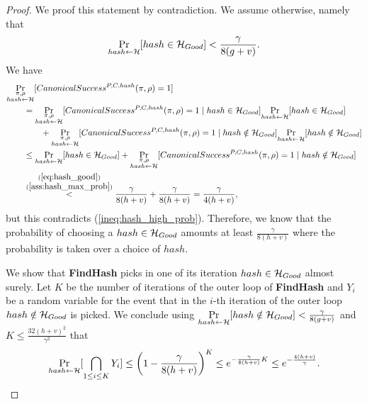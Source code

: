 \begin{proof}
We proof this statement by contradiction.
We assume otherwise, namely that
\begin{align}
  \label{ass:hash_max_prob}
\underset{hash \leftarrow \mathcal{H}}{\Pr}[hash \in \mathcal{H}_{Good}] < \frac{\gamma}{8(g+v)}.
\end{align}
We have
\begin{align*}
  &\underset{\substack{\pi, \rho \\ hash \leftarrow \mathcal{H}}}{\Pr}[CanonicalSuccess^{P,C,hash}(\pi, \rho) = 1] \\
  &\mbox\qquad = \underset{\substack{\pi, \rho \\ hash \leftarrow \mathcal{H}}}{\Pr}[CanonicalSuccess^{P,C,hash}(\pi, \rho) = 1 \mid hash \in \mathcal{H}_{Good}]
  \underset{hash \leftarrow \mathcal{H}}{\Pr}[hash \in \mathcal{H}_{Good}] \\
  & \mbox\qquad\qquad + \underset{\substack{ \pi, \rho \\ hash \leftarrow \mathcal{H}}}{\Pr}[CanonicalSuccess^{P,C,hash}(\pi, \rho) = 1 \mid hash \notin \mathcal{H}_{Good}]
  \underset{hash \leftarrow \mathcal{H}}{\Pr}[hash \notin \mathcal{H}_{Good}] \\
  & \mbox\qquad \leq \underset{hash \leftarrow \mathcal{H}}{\Pr}[hash \in \mathcal{H}_{Good}] +
  \underset{\substack{\pi, \rho\\ hash \leftarrow \mathcal{H} }}{\Pr}[CanonicalSuccess^{P,C,hash}(\pi, \rho) = 1 \mid hash \notin \mathcal{H}_{Good}] \\
  & \mbox\qquad  \stackrel{\substack{ (\ref{eq:hash_good}) \\ (\ref{ass:hash_max_prob})}}{<} \frac{\gamma}{8(h+v)} + \frac{\gamma}{8(h+v)} = \frac{\gamma}{4(h+v)},
\end{align*}
but this contradicts (\ref{ineq:hash_high_prob}).
Therefore, we know that the probability of choosing a $hash \in \mathcal{H}_{Good}$ amounts at least $\frac{\gamma}{8(h+v)}$
where the probability is taken over a choice of $hash$.

We show that \textbf{FindHash} picks in one of its iteration $hash \in \mathcal{H}_{Good}$ almost surely.
Let $K$ be the number of iterations of the outer loop of \textbf{FindHash} and $Y_i$ be a random variable for the event
that in the $i$-th iteration of the outer loop $hash \notin \mathcal{H}_{Good}$ is picked.
We conclude using $\underset{hash \leftarrow \mathcal{H}}{\Pr}[hash \notin \mathcal{H}_{Good}] < \frac{\gamma}{8(g+v)}$ and $K \leq \frac{32(h+v)^2}{\gamma^2}$ that
\begin{align*}
  \underset{hash \leftarrow \mathcal{H}}{\Pr}[ \bigcap_{1 \leq i \leq K} Y_i ] \leq \left(1 - \frac{\gamma}{8(h+v)}\right)^{K}
    \leq e^{-\frac{\gamma}{8(h+v)} K}
    \leq e^{-\frac{4(h+v)}{\gamma}}.
\end{align*}
\end{proof}
